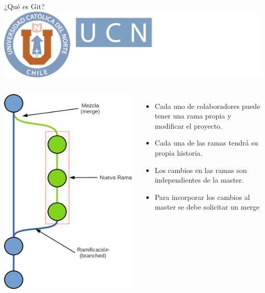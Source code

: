 \documentclass[12pt,a4paper,usenames,x11names,compress]{beamer}
\begin{document}
\begin{frame}{¿Qué es Git?\hfill \includegraphics[scale=.1]{eciem.png}}
\begin{columns}
\includegraphics[scale=.22]{commit_rama.png} 
\begin{itemize}
\justifying
 \item Cada uno de colaboradores puede tener una rama propia y modificar el proyecto.
 \item Cada una de las ramas tendrá su propia historia.
 \item Los cambios en las ramas son independientes de la master.
 \item Para incorporar los cambios al master se debe solicitar un merge
\end{itemize}
\end{columns}
\end{frame}
\end{document}
